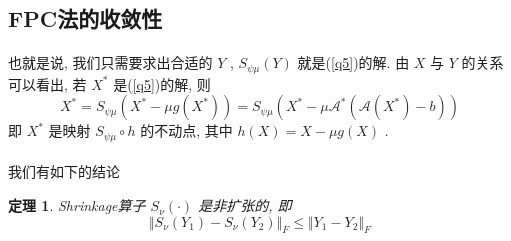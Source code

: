\documentclass[a4paper, UTF8]{ctexart}				%
\newtheorem{theo}{\bf 定理}[section]			  %
\numberwithin{equation}{section}				%
\begin{document}
		\subsection{FPC法的收敛性}
			\paragraph{}
				\quad 也就是说, 我们只需要求出合适的 $Y$ , $S_{\psi \mu}(Y)$ 就是(\ref{q5})的解. 由 $X$ 与 $Y$ 的关系可以看出, 若 $X^*$ 是(\ref{q5})的解, 则
				\begin{equation}
						X^*
					=	S_{\psi \mu}(X^* - \mu g(X^*))
					=	S_{\psi \mu}(X^* - \mu \mathcal{A}^*(\mathcal{A}(X^*) - b))
				\end{equation}
				即 $X^*$ 是映射 $S_{\psi \mu} \circ h$ 的不动点, 其中 $h(X) = X - \mu g(X)$ .

			\paragraph{}
				\quad 我们有如下的结论
				\begin{theo}
					Shrinkage算子 $S_\nu(\cdot)$ 是非扩张的, 即
					\begin{equation}
						\Vert{S_\nu(Y_1) - S_\nu(Y_2)}\Vert_F \le \Vert{Y_1 - Y_2}\Vert_F
					\end{equation}
				\end{theo}
\end{document}

